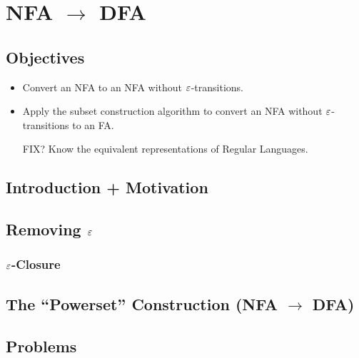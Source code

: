 \chapter{NFA $\to$ DFA}

\section{Objectives}

\begin{itemize}
	\item Convert an NFA to an NFA without $\varepsilon$-transitions.
	\item Apply the subset construction algorithm to convert an NFA without $\varepsilon$-transitions to an FA.
	\item [FIX?] Know the equivalent representations of Regular Languages.
\end{itemize}

\section{Introduction + Motivation}

\section{Removing $\varepsilon$}

\subsection{$\varepsilon$-Closure}

\section{The ``Powerset'' Construction (NFA $\to$ DFA)}



\section{Problems}